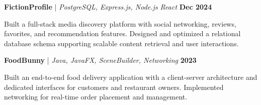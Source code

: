 \documentclass[letterpaper,10pt]{article}
\newcommand{\project}[4]{
\vspace{3pt}
\noindent
\textbf{#1}
#2
\hfill
\textbf{#3}

#4
\vspace{4pt}
}
\begin{document}
\project
{FictionProfile}
{\href{https://github.com/dipit099/FictionProfile-Database_Project}{\faIcon{github}}
\;|\; \textit{PostgreSQL, Express.js, Node.js React}}
{Dec 2024}
{Built a full-stack media discovery platform with social networking, reviews, favorites, and recommendation features. Designed and optimized a relational database schema supporting scalable content retrieval and user interactions.}

\project
{FoodBunny}
{\href{https://github.com/dipit099/FoodBunny-JavaFX-Term-Project-L1T2}{\faIcon{github}}
\;|\; \textit{Java, JavaFX, SceneBuilder, Networking}}
{2023}
{Built an end-to-end food delivery application with a client-server architecture and dedicated interfaces for customers and restaurant owners. Implemented networking for real-time order placement and management.}
\end{document}
